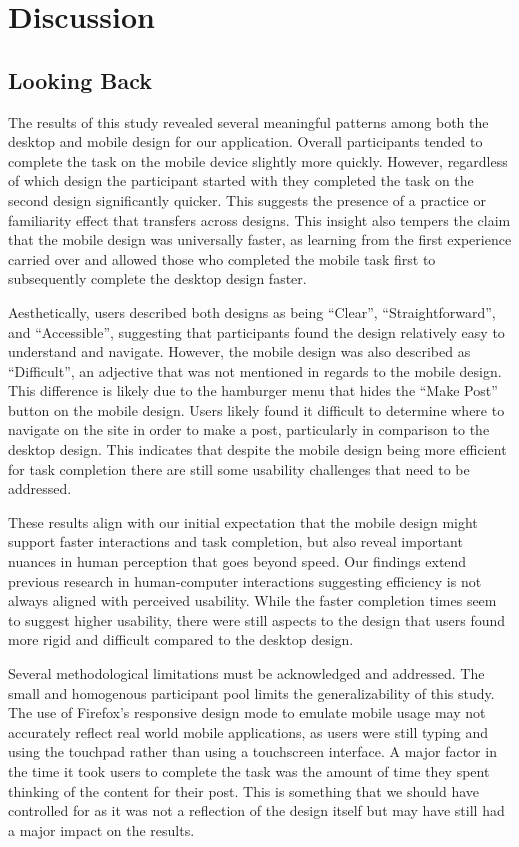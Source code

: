 \documentclass{article}
\begin{document}
\newpage

\section{Discussion}

\subsection{Looking Back}

The results of this study revealed several meaningful patterns among both the desktop and mobile design for our application. Overall participants tended to complete the task on the mobile device slightly more quickly. However, regardless of which design the participant started with they completed the task on the second design significantly quicker. This suggests the presence of a practice or familiarity effect that transfers across designs. This insight also tempers the claim that the mobile design was universally faster, as learning from the first experience carried over and allowed those who completed the mobile task first to subsequently complete the desktop design faster. 


Aesthetically, users described both designs as being “Clear”, “Straightforward”, and “Accessible”, suggesting that participants found the design relatively easy to understand and navigate. However, the mobile design was also described as “Difficult”, an adjective that was not mentioned in regards to the mobile design. This difference is likely due to the hamburger menu that hides the “Make Post” button on the mobile design. Users likely found it difficult to determine where to navigate on the site in order to make a post, particularly in comparison to the desktop design. This indicates that despite the mobile design being more efficient for task completion there are still some usability challenges that need to be addressed.


These results align with our initial expectation that the mobile design might support faster interactions and task completion, but also reveal important nuances in human perception that goes beyond speed. Our findings extend previous research in human-computer interactions suggesting efficiency is not always aligned with perceived usability. While the faster completion times seem to suggest higher usability, there were still aspects to the design that users found more rigid and difficult compared to the desktop design.


Several methodological limitations must be acknowledged and addressed. The small and homogenous participant pool limits the generalizability of this study. The use of Firefox’s responsive design mode to emulate mobile usage may not accurately reflect real world mobile applications, as users were still typing and using the touchpad rather than using a touchscreen interface. A major factor in the time it took users to complete the task was the amount of time they spent thinking of the content for their post. This is something that we should have controlled for as it was not a reflection of the design itself but may have still had a major impact on the results.
\end{document}
